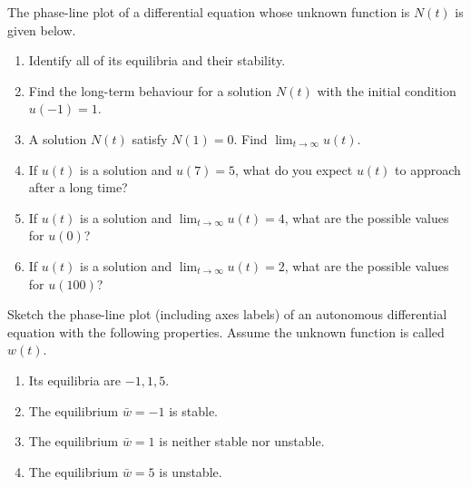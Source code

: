 \documentclass[../main.tex]{subfiles}
\begin{document}
\begin{exercise}
  The phase-line plot of a differential equation whose unknown function is \(N(t)\) is given below.  

  \begin{enumerate}
    \item Identify all of its equilibria and their stability.
    \item Find the long-term behaviour for a solution \(N(t)\) with the initial condition \(u(-1) = 1\). 
    \item A solution \(N(t)\) satisfy \(N(1) = 0\). Find \(\lim_{t \to \infty} u(t)\).
    \item If \(u(t)\) is a solution and \(u(7) = 5\), what do you expect \(u(t)\) to approach after a long time?
    \item If \(u(t)\) is a solution and \(\lim_{t \to \infty} u(t) = 4\), what are the possible values for \(u(0)\)?
    \item If \(u(t)\) is a solution and \(\lim_{t \to \infty} u(t) = 2\), what are the possible values for \(u(100)\)?
  \end{enumerate}
\end{exercise}

\begin{exercise}
  Sketch the phase-line plot (including axes labels) of an autonomous differential equation with the following properties. Assume the unknown function is called \(w(t)\).
  \begin{enumerate}
    \item Its equilibria are \(-1, 1, 5\).
    \item The equilibrium \(\bar{w} = -1\) is stable.
    \item The equilibrium \(\bar{w} = 1\) is neither stable nor unstable.
    \item The equilibrium \(\bar{w} = 5\) is unstable.
  \end{enumerate}
\end{exercise}
\end{document}
